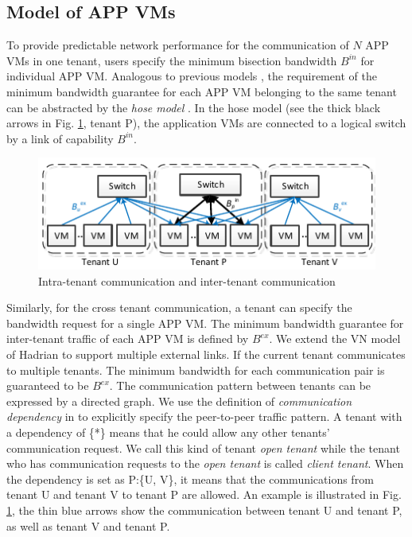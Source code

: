 \documentclass[review]{elsarticle}
\begin{document}
\subsection{Model of APP VMs}
To provide predictable network performance for the communication of $N$ APP VMs in one tenant, users %
specify the minimum bisection bandwidth $B^{in}$ for individual APP VM. Analogous to previous models \cite{B13cta, P12fst}, the requirement of the minimum bandwidth guarantee for each APP VM belonging to the same tenant can be abstracted by the \emph{hose model} \cite{hose_model}. In the hose model (see the thick black arrows in Fig. \ref{fig:hose}, tenant P), the application VMs are connected to a logical switch by a link of capability $B^{in}$.

\begin{figure}
	\centering
		\includegraphics[width=4.5 in]{fig/tagmodel.pdf}
	\caption{Intra-tenant communication and inter-tenant communication}
	\label{fig:hose}
\end{figure}

Similarly, for the cross tenant communication, a tenant can specify the bandwidth request for a single APP VM. The minimum bandwidth guarantee for inter-tenant traffic of each APP VM is defined by $B^{ex}$. We extend the VN model of Hadrian \cite{B13cta} to support multiple external links. If the current tenant communicates to multiple tenants. The minimum bandwidth for each communication pair is guaranteed to be $B^{ex}$. The communication pattern between tenants can be expressed by a directed graph. We use the definition of \emph{communication dependency} in \cite{B13cta} to explicitly specify the peer-to-peer traffic pattern. A tenant with a dependency of \{*\} means that he could allow any other tenants' communication request. We call this kind of tenant \emph{open tenant} while the tenant who has communication requests to the \emph{open tenant} is called \emph{client tenant}. When the dependency is set as P:\{U, V\}, it means that the communications from tenant U and tenant V to tenant P are allowed. An example is illustrated in Fig. \ref{fig:hose}, the thin blue arrows show the communication between tenant U and tenant P, as well as tenant V and tenant P.
\end{document}
